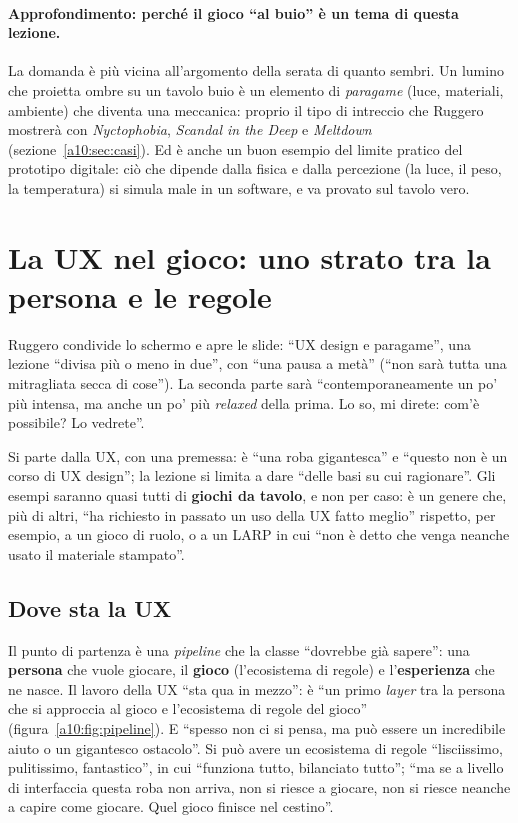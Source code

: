 \paragraph{Approfondimento: perché il gioco ``al buio'' è un tema di questa lezione.}
La domanda è più vicina all'argomento della serata di quanto sembri. Un lumino che
proietta ombre su un tavolo buio è un elemento di \emph{paragame} (luce, materiali,
ambiente) che diventa una meccanica: proprio il tipo di intreccio che Ruggero mostrerà
con \emph{Nyctophobia}, \emph{Scandal in the Deep} e \emph{Meltdown}
(sezione~\ref{a10:sec:casi}). Ed è anche un buon esempio del limite pratico del
prototipo digitale: ciò che dipende dalla fisica e dalla percezione (la luce, il peso,
la temperatura) si simula male in un software, e va provato sul tavolo vero.

\section{La UX nel gioco: uno strato tra la persona e le regole}
\label{a10:sec:ux}

Ruggero condivide lo schermo e apre le slide: ``UX design e paragame'', una lezione
``divisa più o meno in due'', con ``una pausa a metà'' (``non sarà tutta una
mitragliata secca di cose''). La seconda parte sarà ``contemporaneamente un po' più
intensa, ma anche un po' più \emph{relaxed} della prima. Lo so, mi direte: com'è
possibile? Lo vedrete''.

Si parte dalla UX, con una premessa: è ``una roba gigantesca'' e ``questo non è un
corso di UX design''; la lezione si limita a dare ``delle basi su cui ragionare''. Gli
esempi saranno quasi tutti di \textbf{giochi da tavolo}, e non per caso: è un genere
che, più di altri, ``ha richiesto in passato un uso della UX fatto meglio'' rispetto,
per esempio, a un gioco di ruolo, o a un LARP in cui ``non è detto che venga neanche
usato il materiale stampato''.

\subsection{Dove sta la UX}

Il punto di partenza è una \emph{pipeline} che la classe ``dovrebbe già sapere'': una
\textbf{persona} che vuole giocare, il \textbf{gioco} (l'ecosistema di regole) e
l'\textbf{esperienza} che ne nasce. Il lavoro della UX ``sta qua in mezzo'': è ``un
primo \emph{layer} tra la persona che si approccia al gioco e l'ecosistema di regole
del gioco'' (figura~\ref{a10:fig:pipeline}). E ``spesso non ci si pensa, ma può essere
un incredibile aiuto o un gigantesco ostacolo''. Si può avere un ecosistema di regole
``lisciissimo, pulitissimo, fantastico'', in cui ``funziona tutto, bilanciato tutto'';
``ma se a livello di interfaccia questa roba non arriva, non si riesce a giocare, non si
riesce neanche a capire come giocare. Quel gioco finisce nel cestino''.

